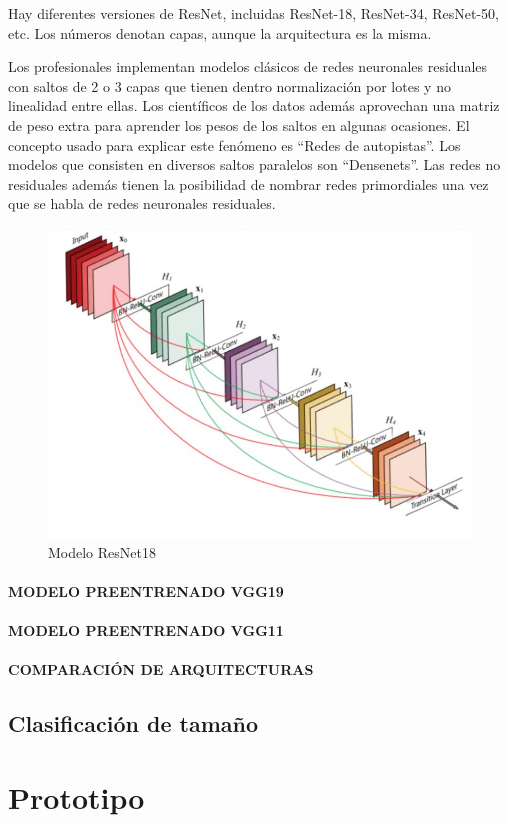 			Hay diferentes versiones de ResNet, incluidas ResNet-18, ResNet-34, ResNet-50, etc. Los números denotan capas, aunque la arquitectura es la misma.
			
			Los profesionales implementan modelos clásicos de redes neuronales residuales con saltos de 2 o 3 capas que tienen dentro normalización por lotes y no linealidad entre ellas. Los científicos de los datos además aprovechan una matriz de peso extra para aprender los pesos de los saltos en algunas ocasiones. El concepto usado para explicar este fenómeno es “Redes de autopistas”. Los modelos que consisten en diversos saltos paralelos son “Densenets”. Las redes no residuales además tienen la posibilidad de nombrar redes primordiales una vez que se habla de redes neuronales residuales.
			
			\begin{figure}[ht]
				\centering
				\includegraphics[scale=0.6]{Figs/6.jpg}
				\caption{Modelo ResNet18}
				\label{fig:ResNet18}
			\end{figure}
			\subsubsection{\MakeUppercase{Modelo preentrenado VGG19}}
			\subsubsection{\MakeUppercase{Modelo preentrenado VGG11}}
			\subsubsection{\MakeUppercase{Comparación de arquitecturas}}
		
	\section{Clasificación de tamaño}
	
\chapter{Prototipo}
	

	















